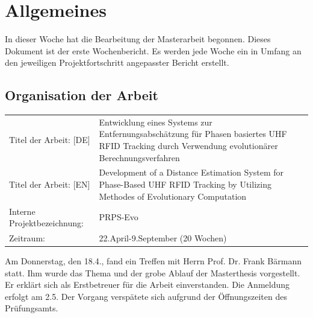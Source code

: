 \documentclass[a4paper,12pt,fleqn]{scrartcl}
\begin{document}
\setlength{\headheight}{36pt}

\begin{titlepage}





\end{titlepage}

\section[Allgemeines]{Allgemeines}
In dieser Woche hat die Bearbeitung der Masterarbeit begonnen. Dieses Dokument ist der erste Wochenbericht. Es werden jede Woche ein in Umfang an den jeweiligen Projektfortschritt angepasster Bericht erstellt.

\subsection{Organisation der Arbeit}
\begin{table}[right]
    \renewcommand{\arraystretch}{1.5}
    \begin{tabular}{lp{11cm}}
      Titel der Arbeit:  [DE] & Entwicklung eines Systems zur
Entfernungsabschätzung für Phasen basiertes UHF RFID Tracking durch Verwendung
evolutionärer Berechnungsverfahren \\
      Titel der Arbeit:  [EN] & Development of a Distance Estimation System for
Phase-Based UHF RFID Tracking by Utilizing Methodes of Evolutionary Computation
\\
      Interne Projektbezeichnung: & PRPS-Evo      \\
      Zeitraum: & 22.April-9.September (20 Wochen)
    \end{tabular}
\end{table}
%
Am Donnerstag, den 18.4., fand ein Treffen mit Herrn Prof. Dr. Frank Bärmann statt. Ihm wurde das Thema und der grobe Ablauf der Masterthesis vorgestellt.
Er erklärt sich als Erstbetreuer für die Arbeit einverstanden.
Die Anmeldung erfolgt am 2.5. Der Vorgang verspätete sich aufgrund der Öffnungszeiten des Prüfungsamts.
\end{document}
